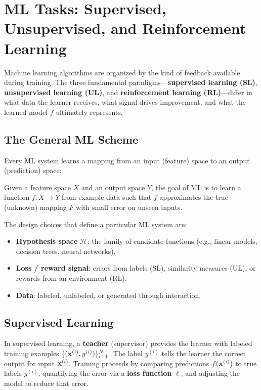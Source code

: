 \chapter*{ML Tasks: Supervised, Unsupervised, and Reinforcement Learning}

Machine learning algorithms are organized by the kind of feedback available during training.
The three fundamental paradigms---\textbf{supervised learning (SL)}, \textbf{unsupervised learning (UL)}, and \textbf{reinforcement learning (RL)}---differ in what data the learner receives, what signal drives improvement, and what the learned model $f$ ultimately represents.

\section*{The General ML Scheme}

Every ML system learns a mapping from an input (feature) space to an output (prediction) space:

\begin{definition}
Given a feature space $X$ and an output space $Y$, the goal of ML is to learn a function $f: X \to Y$ from example data such that $f$ approximates the true (unknown) mapping $F$ with small error on unseen inputs.
\end{definition}

The design choices that define a particular ML system are:
\begin{itemize}
    \item \textbf{Hypothesis space} $\mathcal{H}$: the family of candidate functions (e.g., linear models, decision trees, neural networks).
    \item \textbf{Loss / reward signal}: errors from labels (SL), similarity measures (UL), or rewards from an environment (RL).
    \item \textbf{Data}: labeled, unlabeled, or generated through interaction.
\end{itemize}

\section*{Supervised Learning}

In supervised learning, a \textbf{teacher} (supervisor) provides the learner with labeled training examples $\{(\mathbf{x}^{(i)}, y^{(i)})\}_{i=1}^N$.
The label $y^{(i)}$ tells the learner the correct output for input $\mathbf{x}^{(i)}$.
Training proceeds by comparing predictions $f(\mathbf{x}^{(i)})$ to true labels $y^{(i)}$, quantifying the error via a \textbf{loss function} $\ell$, and adjusting the model to reduce that error.

